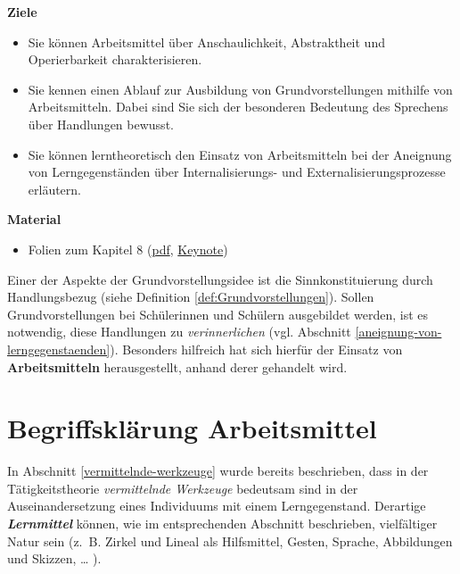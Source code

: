 \documentclass[
]{scrbook}
\providecommand{\tightlist}{%
  \setlength{\itemsep}{0pt}\setlength{\parskip}{0pt}}
\renewenvironment{quote}{
  \list{}{
	\leftmargin0.2cm   %
    \rightmargin\leftmargin
      	\def\FrameCommand
    {%
        {\color{quoteColor}\vrule width 2pt}%
        \hspace{0pt}%
    }%
    \MakeFramed{\advance \hsize -\width \FrameRestore}    \color{quoteColor}
    }
  \item\relax
}
{\endlist\color{black}\endMakeFramed}
\theoremstyle{definition}
\theoremstyle{definition}
\theoremstyle{definition}
\theoremstyle{definition}
\theoremstyle{remark}
\begin{document}
\begin{quote}
\textbf{Ziele}

\begin{itemize}
\tightlist
\item
  Sie können Arbeitsmittel über Anschaulichkeit, Abstraktheit und Operierbarkeit charakterisieren.
\item
  Sie kennen einen Ablauf zur Ausbildung von Grundvorstellungen mithilfe von Arbeitsmitteln. Dabei sind Sie sich der besonderen Bedeutung des Sprechens über Handlungen bewusst.
\item
  Sie können lerntheoretisch den Einsatz von Arbeitsmitteln bei der Aneignung von Lerngegenständen über Internalisierungs- und Externalisierungsprozesse erläutern.
\end{itemize}

\textbf{Material}

\begin{itemize}
\tightlist
\item
  Folien zum Kapitel 8 (\href{files/Stoffdidaktik2024-08-Arbeitsmittel.pdf}{pdf}, \href{files/Stoffdidaktik2024-08-Arbeitsmittel.key}{Keynote})
\end{itemize}
\end{quote}

Einer der Aspekte der Grundvorstellungsidee ist die Sinnkonstituierung durch Handlungsbezug (siehe Definition \ref{def:Grundvorstellungen}). Sollen Grundvorstellungen bei Schülerinnen und Schülern ausgebildet werden, ist es notwendig, diese Handlungen zu \emph{verinnerlichen} (vgl. Abschnitt \ref{aneignung-von-lerngegenstaenden}). Besonders hilfreich hat sich hierfür der Einsatz von \textbf{Arbeitsmitteln} herausgestellt, anhand derer gehandelt wird.

\section{Begriffsklärung Arbeitsmittel}\label{arbeitsmittel-begriffsklaerung}

In Abschnitt \ref{vermittelnde-werkzeuge} wurde bereits beschrieben, dass in der Tätigkeitstheorie \emph{vermittelnde Werkzeuge} bedeutsam sind in der Auseinandersetzung eines Individuums mit einem Lerngegenstand. Derartige \textbf{\emph{Lernmittel}} können, wie im entsprechenden Abschnitt beschrieben, vielfältiger Natur sein (z.~B. Zirkel und Lineal als Hilfsmittel, Gesten, Sprache, Abbildungen und Skizzen, \ldots{} ).
\end{document}
